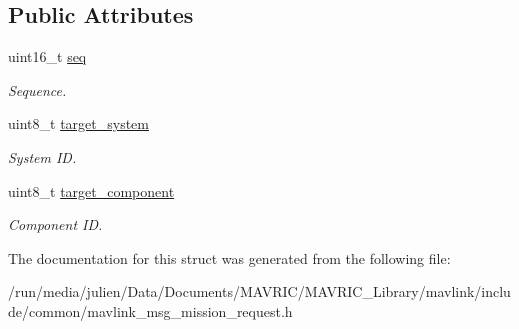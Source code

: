 \subsection*{Public Attributes}
\begin{DoxyCompactItemize}
\item 
\hypertarget{struct____mavlink__mission__request__t_adc8352db8e2a6dd3c5db6ec297e6d7ed}{uint16\+\_\+t \hyperlink{struct____mavlink__mission__request__t_adc8352db8e2a6dd3c5db6ec297e6d7ed}{seq}}\label{struct____mavlink__mission__request__t_adc8352db8e2a6dd3c5db6ec297e6d7ed}

\begin{DoxyCompactList}\small\item\em Sequence. \end{DoxyCompactList}\item 
\hypertarget{struct____mavlink__mission__request__t_a8e2bdf5722c43082dfccd49839f7da43}{uint8\+\_\+t \hyperlink{struct____mavlink__mission__request__t_a8e2bdf5722c43082dfccd49839f7da43}{target\+\_\+system}}\label{struct____mavlink__mission__request__t_a8e2bdf5722c43082dfccd49839f7da43}

\begin{DoxyCompactList}\small\item\em System I\+D. \end{DoxyCompactList}\item 
\hypertarget{struct____mavlink__mission__request__t_a3bef9f78c3256322231456b15601f1a6}{uint8\+\_\+t \hyperlink{struct____mavlink__mission__request__t_a3bef9f78c3256322231456b15601f1a6}{target\+\_\+component}}\label{struct____mavlink__mission__request__t_a3bef9f78c3256322231456b15601f1a6}

\begin{DoxyCompactList}\small\item\em Component I\+D. \end{DoxyCompactList}\end{DoxyCompactItemize}


The documentation for this struct was generated from the following file\+:\begin{DoxyCompactItemize}
\item 
/run/media/julien/\+Data/\+Documents/\+M\+A\+V\+R\+I\+C/\+M\+A\+V\+R\+I\+C\+\_\+\+Library/mavlink/include/common/mavlink\+\_\+msg\+\_\+mission\+\_\+request.\+h\end{DoxyCompactItemize}
